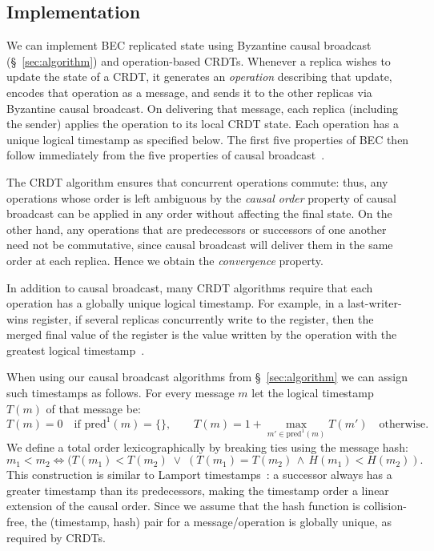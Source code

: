 \documentclass[a4paper,anonymous,USenglish]{lipics-v2019}
\begin{document}
\subsection{Implementation}

We can implement BEC replicated state using Byzantine causal broadcast (\S~\ref{sec:algorithm}) and operation-based CRDTs.
Whenever a replica wishes to update the state of a CRDT, it generates an \emph{operation} describing that update, encodes that operation as a message, and sends it to the other replicas via Byzantine causal broadcast.
On delivering that message, each replica (including the sender) applies the operation to its local CRDT state.
Each operation has a unique logical timestamp as specified below.
The first five properties of BEC then follow immediately from the five properties of causal broadcast~\cite{Gomes:2017gy}.

The CRDT algorithm ensures that concurrent operations commute: thus, any operations whose order is left ambiguous by the \emph{causal order} property of causal broadcast can be applied in any order without affecting the final state.
On the other hand, any operations that are predecessors or successors of one another need not be commutative, since causal broadcast will deliver them in the same order at each replica.
Hence we obtain the \emph{convergence} property.

In addition to causal broadcast, many CRDT algorithms require that each operation has a globally unique logical timestamp.
For example, in a last-writer-wins register, if several replicas concurrently write to the register, then the merged final value of the register is the value written by the operation with the greatest logical timestamp~\cite{Shapiro:2011wy}.

When using our causal broadcast algorithms from \S~\ref{sec:algorithm} we can assign such timestamps as follows.
For every message $m$ let the logical timestamp $T(m)$ of that message be:
\[ T(m) = 0 \quad\text{if } \mathrm{pred}^1(m) = \{\}, \qquad
T(m) = 1 + \max_{m' \in \mathrm{pred}^1(m)} T(m') \quad\text{otherwise.} \]
We define a total order lexicographically by breaking ties using the message hash:
\[ m_1 < m_2 \iff (T(m_1) < T(m_2) \;\vee\; (T(m_1) = T(m_2) \,\wedge\, H(m_1) < H(m_2)). \]
This construction is similar to Lamport timestamps~\cite{Lamport:1978}: a successor always has a greater timestamp than its predecessors, making the timestamp order a linear extension of the causal order.
Since we assume that the hash function is collision-free, the (timestamp, hash) pair for a message/operation is globally unique, as required by CRDTs.
\end{document}
